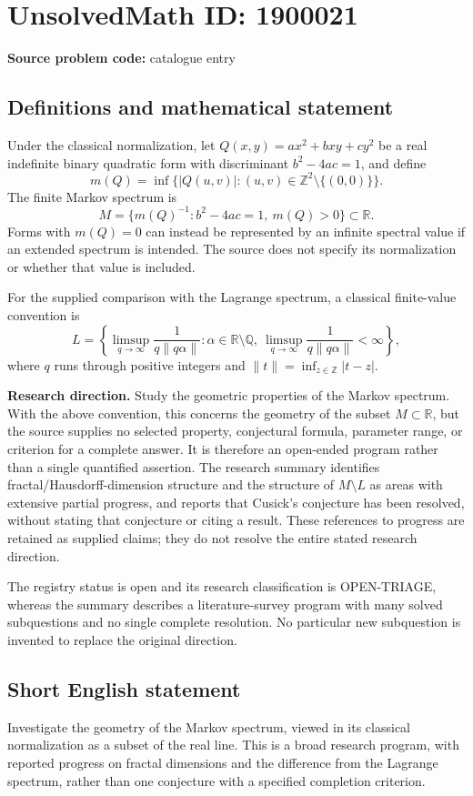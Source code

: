 \documentclass[11pt]{article}
\newcommand{\Z}{\mathbb{Z}}
\newcommand{\Q}{\mathbb{Q}}
\newcommand{\R}{\mathbb{R}}
\begin{document}
\section*{UnsolvedMath ID: 1900021}
\textbf{Source problem code:} catalogue entry
\subsection{Definitions and mathematical statement}
Under the classical normalization, let $Q(x,y)=ax^2+bxy+cy^2$ be a real indefinite binary quadratic form with discriminant $b^2-4ac=1$, and define
\[
 m(Q)=\inf\{|Q(u,v)|:(u,v)\in\Z^2\setminus\{(0,0)\}\}.
\]
The finite Markov spectrum is
\[
 M=\{m(Q)^{-1}:b^2-4ac=1,\ m(Q)>0\}\subset\R.
\]
Forms with $m(Q)=0$ can instead be represented by an infinite spectral value if an extended spectrum is intended. The source does not specify its normalization or whether that value is included.

For the supplied comparison with the Lagrange spectrum, a classical finite-value convention is
\[
 L=\left\{\limsup_{q\to\infty}\frac{1}{q\|q\alpha\|}:\alpha\in\R\setminus\Q,\ 
 \limsup_{q\to\infty}\frac{1}{q\|q\alpha\|}<\infty\right\},
\]
where $q$ runs through positive integers and $\|t\|=\inf_{z\in\Z}|t-z|$.

\textbf{Research direction.} Study the geometric properties of the Markov spectrum. With the above convention, this concerns the geometry of the subset $M\subset\R$, but the source supplies no selected property, conjectural formula, parameter range, or criterion for a complete answer. It is therefore an open-ended program rather than a single quantified assertion. The research summary identifies fractal/Hausdorff-dimension structure and the structure of $M\setminus L$ as areas with extensive partial progress, and reports that Cusick's conjecture has been resolved, without stating that conjecture or citing a result. These references to progress are retained as supplied claims; they do not resolve the entire stated research direction.

The registry status is open and its research classification is OPEN-TRIAGE, whereas the summary describes a literature-survey program with many solved subquestions and no single complete resolution. No particular new subquestion is invented to replace the original direction.
\subsection{Short English statement}
Investigate the geometry of the Markov spectrum, viewed in its classical normalization as a subset of the real line. This is a broad research program, with reported progress on fractal dimensions and the difference from the Lagrange spectrum, rather than one conjecture with a specified completion criterion.
\end{document}
